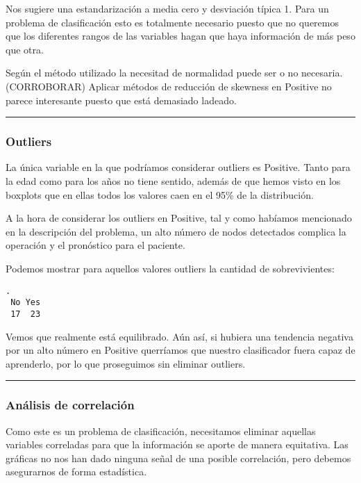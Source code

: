 \documentclass[
]{article}
\begin{document}
Nos sugiere una estandarización a media cero y desviación típica 1. Para
un problema de clasificación esto es totalmente necesario puesto que no
queremos que los diferentes rangos de las variables hagan que haya
información de más peso que otra.

Según el método utilizado la necesitad de normalidad puede ser o no
necesaria. (CORROBORAR) Aplicar métodos de reducción de skewness en
Positive no parece interesante puesto que está demasiado ladeado.

\begin{center}\rule{0.5\linewidth}{0.5pt}\end{center}

\hypertarget{outliers}{%
\subsubsection{Outliers}\label{outliers}}

La única variable en la que podríamos considerar outliers es Positive.
Tanto para la edad como para los años no tiene sentido, además de que
hemos visto en los boxplots que en ellas todos los valores caen en el
95\% de la distribución.

A la hora de considerar los outliers en Positive, tal y como habíamos
mencionado en la descripción del problema, un alto número de nodos
detectados complica la operación y el pronóstico para el paciente.

Podemos mostrar para aquellos valores outliers la cantidad de
sobrevivientes:

\begin{verbatim}
.
 No Yes 
 17  23 
\end{verbatim}

Vemos que realmente está equilibrado. Aún así, si hubiera una tendencia
negativa por un alto número en Positive querríamos que nuestro
clasificador fuera capaz de aprenderlo, por lo que proseguimos sin
eliminar outliers.

\begin{center}\rule{0.5\linewidth}{0.5pt}\end{center}

\hypertarget{anuxe1lisis-de-correlaciuxf3n}{%
\subsubsection{Análisis de
correlación}\label{anuxe1lisis-de-correlaciuxf3n}}

Como este es un problema de clasificación, necesitamos eliminar aquellas
variables correladas para que la información se aporte de manera
equitativa. Las gráficas no nos han dado ninguna señal de una posible
correlación, pero debemos asegurarnos de forma estadística.
\end{document}
